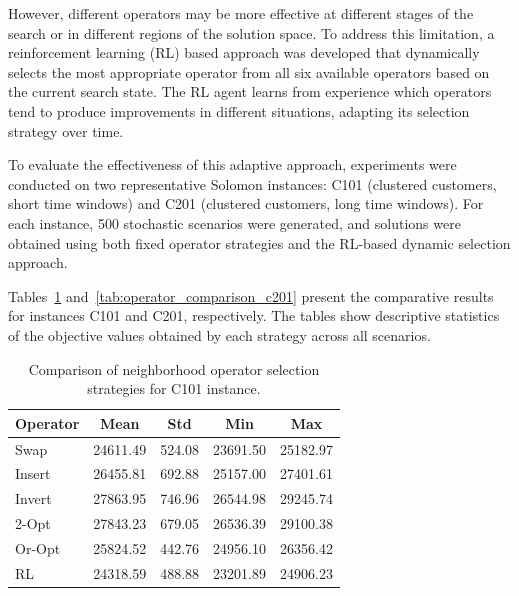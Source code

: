 However, different operators may be more effective at different stages of the search or in different regions of the solution space. To address this limitation, a reinforcement learning (RL) based approach was developed that dynamically selects the most appropriate operator from all six available operators based on the current search state. The RL agent learns from experience which operators tend to produce improvements in different situations, adapting its selection strategy over time.

To evaluate the effectiveness of this adaptive approach, experiments were conducted on two representative Solomon instances: C101 (clustered customers, short time windows) and C201 (clustered customers, long time windows). For each instance, 500 stochastic scenarios were generated, and solutions were obtained using both fixed operator strategies and the RL-based dynamic selection approach.

Tables~\ref{tab:operator_comparison_c101} and~\ref{tab:operator_comparison_c201} present the comparative results for instances C101 and C201, respectively. The tables show descriptive statistics of the objective values obtained by each strategy across all scenarios.

\begin{table}[ht]
\renewcommand{\arraystretch}{1.3}
\centering
\caption{Comparison of neighborhood operator selection strategies for C101 instance.}
\label{tab:operator_comparison_c101}
\begin{tabular}{l|c|c|c|c}
\hline\hline
Operator & Mean & Std & Min & Max \\
\hline
Swap       & 24611.49 &  524.08 & 23691.50 & 25182.97 \\
Insert     & 26455.81 &  692.88 & 25157.00 & 27401.61 \\
Invert     & 27863.95 &  746.96 & 26544.98 & 29245.74 \\
2-Opt      & 27843.23 &  679.05 & 26536.39 & 29100.38 \\
Or-Opt     & 25824.52 &  442.76 & 24956.10 & 26356.42 \\
RL         & 24318.59 &  488.88 & 23201.89 & 24906.23 \\
\hline\hline
\end{tabular}
\end{table}

